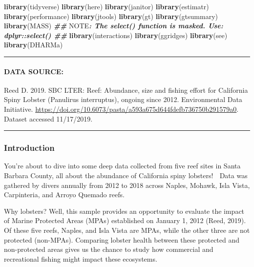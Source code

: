 \documentclass[
]{article}
\newenvironment{Shaded}{\begin{snugshade}}{\end{snugshade}}
\newcommand{\AlertTok}[1]{\textcolor[rgb]{0.94,0.16,0.16}{#1}}
\newcommand{\DocumentationTok}[1]{\textcolor[rgb]{0.56,0.35,0.01}{\textbf{\textit{#1}}}}
\newcommand{\FunctionTok}[1]{\textcolor[rgb]{0.13,0.29,0.53}{\textbf{#1}}}
\newcommand{\NormalTok}[1]{#1}
\begin{document}
\begin{Shaded}
\begin{Highlighting}[]
\FunctionTok{library}\NormalTok{(tidyverse)}
\FunctionTok{library}\NormalTok{(here)}
\FunctionTok{library}\NormalTok{(janitor)}
\FunctionTok{library}\NormalTok{(estimatr)  }
\FunctionTok{library}\NormalTok{(performance)}
\FunctionTok{library}\NormalTok{(jtools)}
\FunctionTok{library}\NormalTok{(gt)}
\FunctionTok{library}\NormalTok{(gtsummary)}
\FunctionTok{library}\NormalTok{(MASS) }\DocumentationTok{\#\# }\AlertTok{NOTE}\DocumentationTok{: The \textasciigrave{}select()\textasciigrave{} function is masked. Use: \textasciigrave{}dplyr::select()\textasciigrave{} \#\#}
\FunctionTok{library}\NormalTok{(interactions) }
\FunctionTok{library}\NormalTok{(ggridges)}
\FunctionTok{library}\NormalTok{(see)}
\FunctionTok{library}\NormalTok{(DHARMa)}
\end{Highlighting}
\end{Shaded}

\begin{center}\rule{0.5\linewidth}{0.5pt}\end{center}

\hypertarget{data-source}{%
\paragraph{DATA SOURCE:}\label{data-source}}

Reed D. 2019. SBC LTER: Reef: Abundance, size and fishing effort for
California Spiny Lobster (Panulirus interruptus), ongoing since 2012.
Environmental Data Initiative.
\url{https://doi.org/10.6073/pasta/a593a675d644fdefb736750b291579a0}.
Dataset accessed 11/17/2019.

\begin{center}\rule{0.5\linewidth}{0.5pt}\end{center}

\hypertarget{introduction}{%
\subsubsection{\texorpdfstring{\textbf{Introduction}}{Introduction}}\label{introduction}}

You're about to dive into some deep data collected from five reef sites
in Santa Barbara County, all about the abundance of California spiny
lobsters! 🦞 Data was gathered by divers annually from 2012 to 2018
across Naples, Mohawk, Isla Vista, Carpinteria, and Arroyo Quemado
reefs.

Why lobsters? Well, this sample provides an opportunity to evaluate the
impact of Marine Protected Areas (MPAs) established on January 1, 2012
(Reed, 2019). Of these five reefs, Naples, and Isla Vista are MPAs,
while the other three are not protected (non-MPAs). Comparing lobster
health between these protected and non-protected areas gives us the
chance to study how commercial and recreational fishing might impact
these ecosystems.
\end{document}
